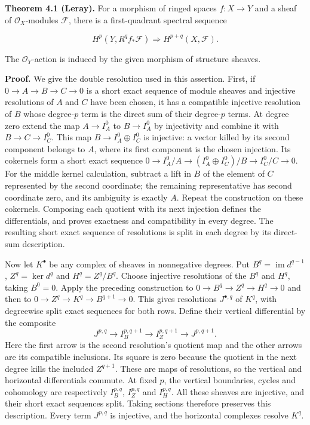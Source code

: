 \documentclass[11pt,a4paper,openany]{report}
\begin{document}
\textbf{Theorem 4.1 (Leray).} For a morphism of ringed spaces \(f:X\to Y\) and a sheaf of \(\mathcal O_X\)-modules \(\mathcal F\), there is a first-quadrant spectral sequence

\[
H^p(Y,R^qf_*\mathcal F)\Longrightarrow H^{p+q}(X,\mathcal F).
\]

The \(\mathcal O_Y\)-action is induced by the given morphism of structure sheaves.

\textbf{Proof.} We give the double resolution used in this assertion. First, if \(0\to A\to B\to C\to0\) is a short exact sequence of module sheaves and injective resolutions of \(A\) and \(C\) have been chosen, it has a compatible injective resolution of \(B\) whose degree-\(p\) term is the direct sum of their degree-\(p\) terms. At degree zero extend the map \(A\to I_A^0\) to \(B\to I_A^0\) by injectivity and combine it with \(B\to C\to I_C^0\). This map \(B\to I_A^0\oplus I_C^0\) is injective: a vector killed by its second component belongs to \(A\), where its first component is the chosen injection. Its cokernels form a short exact sequence \(0\to I_A^0/A\to(I_A^0\oplus I_C^0)/B\to I_C^0/C\to0\). For the middle kernel calculation, subtract a lift in \(B\) of the element of \(C\) represented by the second coordinate; the remaining representative has second coordinate zero, and its ambiguity is exactly \(A\). Repeat the construction on these cokernels. Composing each quotient with its next injection defines the differentials, and proves exactness and compatibility in every degree. The resulting short exact sequence of resolutions is split in each degree by its direct-sum description.

Now let \(K^\bullet\) be any complex of sheaves in nonnegative degrees. Put \(B^q=\operatorname{im}d^{q-1}\), \(Z^q=\ker d^q\) and \(H^q=Z^q/B^q\). Choose injective resolutions of the \(B^q\) and \(H^q\), taking \(B^0=0\). Apply the preceding construction to \(0\to B^q\to Z^q\to H^q\to0\) and then to \(0\to Z^q\to K^q\to B^{q+1}\to0\). This gives resolutions \(J^{\bullet,q}\) of \(K^q\), with degreewise split exact sequences for both rows. Define their vertical differential by the composite \[
J^{p,q}\longrightarrow I_B^{p,q+1}
\longrightarrow I_Z^{p,q+1}\longrightarrow J^{p,q+1}.
\] Here the first arrow is the second resolution's quotient map and the other arrows are its compatible inclusions. Its square is zero because the quotient in the next degree kills the included \(Z^{q+1}\). These are maps of resolutions, so the vertical and horizontal differentials commute. At fixed \(p\), the vertical boundaries, cycles and cohomology are respectively \(I_B^{p,q}\), \(I_Z^{p,q}\) and \(I_H^{p,q}\). All these sheaves are injective, and their short exact sequences split. Taking sections therefore preserves this description. Every term \(J^{p,q}\) is injective, and the horizontal complexes resolve \(K^q\).
\end{document}

